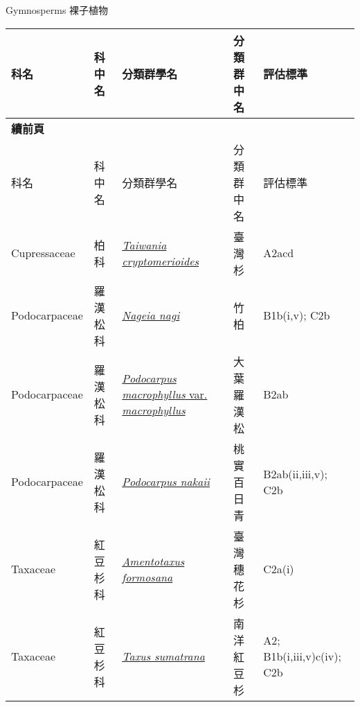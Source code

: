 \noindent\normalfont\selectfont Gymnosperms 裸子植物
\footnotesize\selectfont
        {\def\arraystretch{1.5}\tabcolsep=2pt
        \begin{longtable}{p{2.5cm}p{2.5cm}p{4.5cm}p{2.5cm}p{3cm}}
        \toprule
          科名 & 科中名 & 分類群學名 & 分類群中名 & 評估標準 \\
        \midrule 
        \endfirsthead

        {{\bfseries 續前頁 }} \\
        科名 & 科中名 & 分類群學名 & 分類群中名 & 評估標準 \\
        \midrule
        \endhead
                Cupressaceae & 柏科 & \href{http://www.theplantlist.org/tpl1.1/search?q=Taiwania+cryptomerioides}{\textit{Taiwania cryptomerioides} } & 臺灣杉 & A2acd \index{Taiwania@\textit{Taiwania}!cryptomerioides@\textit{cryptomerioides}}  \index{臺灣杉} \\
    Podocarpaceae & 羅漢松科 & \href{http://www.theplantlist.org/tpl1.1/search?q=Nageia+nagi}{\textit{Nageia nagi} } & 竹柏 & B1b(i,v); C2b \index{Nageia@\textit{Nageia}!nagi@\textit{nagi}}  \index{竹柏} \\
    Podocarpaceae & 羅漢松科 & \href{http://www.theplantlist.org/tpl1.1/search?q=Podocarpus+macrophyllus+var.+macrophyllus}{\textit{Podocarpus macrophyllus} var. \textit{macrophyllus} } & 大葉羅漢松 & B2ab \index{Podocarpus@\textit{Podocarpus}!macrophyllus@\textit{macrophyllus}!var. macrophyllus@var. \textit{macrophyllus}}  \index{大葉羅漢松} \\
    Podocarpaceae & 羅漢松科 & \href{http://www.theplantlist.org/tpl1.1/search?q=Podocarpus+nakaii}{\textit{Podocarpus nakaii} } & 桃實百日青 & B2ab(ii,iii,v); C2b \index{Podocarpus@\textit{Podocarpus}!nakaii@\textit{nakaii}}  \index{桃實百日青} \\
    Taxaceae & 紅豆杉科 & \href{http://www.theplantlist.org/tpl1.1/search?q=Amentotaxus+formosana}{\textit{Amentotaxus formosana} } & 臺灣穗花杉 & C2a(i) \index{Amentotaxus@\textit{Amentotaxus}!formosana@\textit{formosana}}  \index{臺灣穗花杉} \\
    Taxaceae & 紅豆杉科 & \href{http://www.theplantlist.org/tpl1.1/search?q=Taxus+sumatrana}{\textit{Taxus sumatrana} } & 南洋紅豆杉 & A2; B1b(i,iii,v)c(iv); C2b \index{Taxus@\textit{Taxus}!sumatrana@\textit{sumatrana}}  \index{南洋紅豆杉} \\
    \bottomrule
        \end{longtable}
        }
    